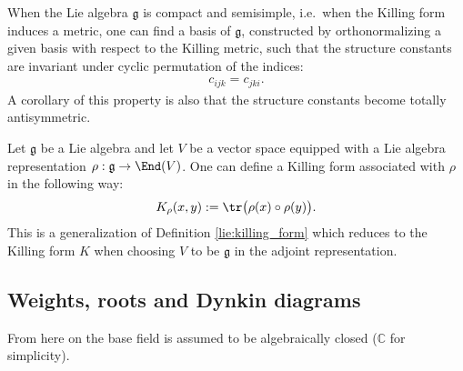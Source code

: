     \begin{property}
        When the Lie algebra $\mathfrak{g}$ is compact and semisimple, i.e.~when the Killing form induces a metric, one can find a basis of $\mathfrak{g}$, constructed by orthonormalizing a given basis with respect to the Killing metric, such that the structure constants are invariant under cyclic permutation of the indices:
        \begin{gather}
            c_{ijk} = c_{jki}.
        \end{gather}
        A corollary of this property is also that the structure constants become totally antisymmetric.
    \end{property}

    \begin{construct}\label{lie:rho_killing_form}
        Let $\mathfrak{g}$ be a Lie algebra and let $V$ be a vector space equipped with a Lie algebra representation $\rho:\mathfrak{g}\rightarrow\End(V)$. One can define a Killing form associated with $\rho$ in the following way:
        \begin{gather}
            K_\rho(x,y) := \tr\big(\rho(x)\circ\rho(y)\big).
        \end{gather}
        This is a generalization of Definition \ref{lie:killing_form} which reduces to the Killing form $K$ when choosing $V$ to be $\mathfrak{g}$ in the adjoint representation.
    \end{construct}

\subsection{Weights, roots and Dynkin diagrams}\label{section:weights_roots}

    From here on the base field is assumed to be algebraically closed ($\mathbb{C}$ for simplicity).


